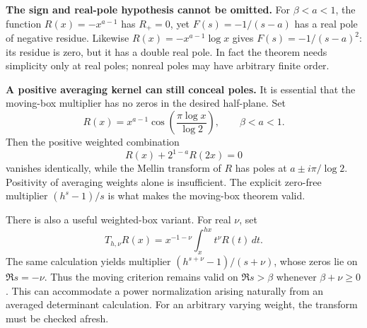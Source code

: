 \textbf{The sign and real-pole hypothesis cannot be omitted.}
For $\beta<a<1$, the function $R(x)=-x^{a-1}$ has
$R_+=0$, yet $F(s)=-1/(s-a)$ has a real pole of negative residue.
Likewise $R(x)=-x^{a-1}\log x$ gives
$F(s)=-1/(s-a)^2$: its residue is zero, but it has a double real
pole. In fact the theorem needs simplicity only at real poles;
nonreal poles may have arbitrary finite order.

\textbf{A positive averaging kernel can still conceal poles.}
It is essential that the moving-box multiplier has no zeros in
the desired half-plane. Set
\[
 R(x)=x^{a-1}\cos\!\left(\frac{\pi\log x}{\log2}\right),
 \qquad \beta<a<1.
\]
Then the positive weighted combination
\[
 R(x)+2^{1-a}R(2x)=0
\]
vanishes identically, while the Mellin transform of $R$ has poles
at $a\pm i\pi/\log2$. Positivity of averaging weights alone is
insufficient. The explicit zero-free multiplier
$(h^s-1)/s$ is what makes the moving-box theorem valid.

There is also a useful weighted-box variant. For real $\nu$, set
\[
 T_{h,\nu}R(x)=x^{-1-\nu}\int_x^{hx}t^\nu R(t)\,dt.
\]
The same calculation yields multiplier
$(h^{s+\nu}-1)/(s+\nu)$, whose zeros lie on
$\Re s=-\nu$. Thus the moving criterion remains valid on
$\Re s>\beta$ whenever $\beta+\nu\ge0$. This can accommodate
a power normalization arising naturally from an averaged
determinant calculation. For an arbitrary varying weight, the
transform must be checked afresh.

